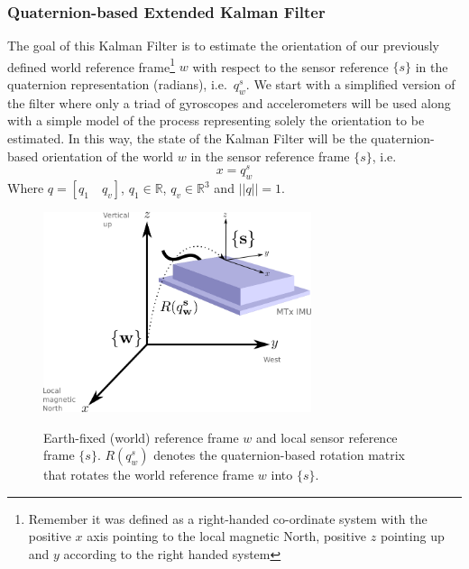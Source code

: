 \documentclass[12pt,a4paper,twoside]{article}
\begin{document}
\subsubsection{Quaternion-based Extended Kalman Filter}
The goal of this Kalman Filter is to estimate the orientation of our previously defined world reference frame\footnote{Remember it was defined as a right-handed co-ordinate system with the positive $x$ axis pointing to the local magnetic North, positive $z$ pointing up and $y$ according to the right handed system} $w$ with respect to the sensor reference $\{s\}$ in the quaternion representation (radians), i.e.~$q^{s}_{w}$. We start with a simplified version of the filter where only a triad of gyroscopes and accelerometers will be used along with a simple model of the process representing solely the orientation to be estimated. In this way, the state of the Kalman Filter will be the quaternion-based orientation of the world $w$ in the sensor reference frame $\{s\}$, i.e.
\begin{equation}
  x = q^{s}_{w}
\end{equation}
Where $q = [q_1 \quad q_v]$, $q_1 \in \mathbb{R}$, $q_v \in \mathbb{R}^3$ and $||q|| = 1$. 

\begin{figure}[ht!]
 \centering
 \includegraphics[width=0.7\textwidth]{images/MixCoordSys.png}
 \label{fig:coordsys}
 \caption{Earth-fixed (world) reference frame $w$ and local sensor reference frame $\{s\}$. $R(q^{s}_{w})$ denotes the quaternion-based rotation matrix that rotates the world reference frame $w$ into $\{s\}$. }
\end{figure}
\end{document}
